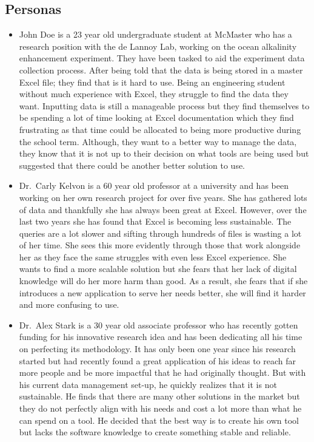 \documentclass[12pt]{article}
\begin{document}
\subsection{Personas}
\label{personas}
\begin{itemize}
  \item John Doe is a 23 year old undergraduate student at McMaster who has a
  research position with the de Lannoy Lab, working on the ocean alkalinity
  enhancement experiment. They have been
  tasked to aid the experiment data collection process. After being told that
  the data is being stored in a master Excel file; they find that is it hard to
  use. Being an engineering student without much experience with Excel, they
  struggle to find the data they want. Inputting data is still a manageable
  process but they find themselves to be spending a lot of time looking at Excel
  documentation which they find frustrating as that time could be allocated to
  being more productive during the school term. Although, they want to a better
  way to manage the data, they know that it is not up to their decision on what
  tools are being used but suggested that there could be another better solution
  to use. 
  \item Dr.\ Carly Kelvon is a 60 year old professor at a university and
  has been working on her own research project for over five years. She has gathered
  lots of data and thankfully she has always been great at Excel. However, over
  the last two years she has found that Excel is becoming less sustainable. The
  queries are a lot slower and sifting through hundreds of files is
  wasting a lot of her time. She sees this more evidently through those that
  work alongside her as they face the same struggles with even less
  Excel experience. She wants to find a more scalable solution but she
  fears that her lack of digital knowledge will do her more harm than good. As a
  result, she fears that if she introduces a new application to serve her needs
  better, she will find it harder and more confusing to use. 
  \item Dr.\ Alex Stark is a 30 year old associate professor who has recently
  gotten funding for his innovative research idea and has been dedicating all
  his time on perfecting its methodology. It has only been one year since his
  research started but had recently found a great application of his ideas to
  reach far more people and be more impactful that he had originally thought.
  But with his current data management set-up, he quickly realizes that it is not
  sustainable. He finds that there are many other solutions in the market but
  they do not perfectly align with his needs and cost a lot more than what he can spend
  on a tool. He decided that the best way is to create his own tool but lacks
  the software knowledge to create something stable and reliable. 
\end{itemize}
    
\end{document}
